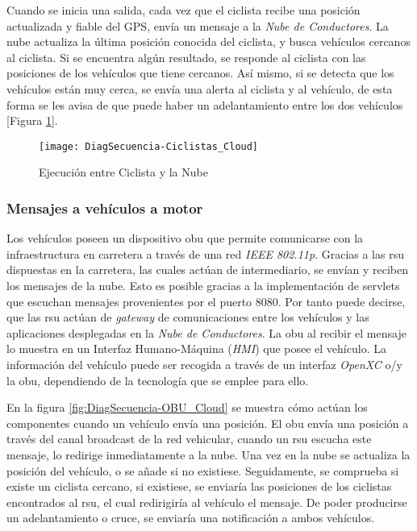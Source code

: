 Cuando se inicia una salida, cada vez que el ciclista recibe una posición actualizada
y fiable del GPS, envía un mensaje a la \emph{Nube de Conductores}. La nube actualiza
la última posición conocida del ciclista, y busca vehículos cercanos al ciclista. Si se
encuentra algún resultado, se responde al ciclista con las posiciones de los vehículos
que tiene cercanos. Así mismo, si se detecta que los vehículos están muy cerca, se
envía una alerta al ciclista y al vehículo, de esta forma se les avisa de que puede haber
un adelantamiento entre los dos vehículos [Figura \ref{fig:DiagSecuencia-Ciclista_Cloud}].
\begin{figure}[H]
	\begin{center}
		\texttt{[image: DiagSecuencia-Ciclistas\_Cloud]}
		\caption{Ejecución entre Ciclista y la Nube}
		\label{fig:DiagSecuencia-Ciclista_Cloud}
	\end{center}
\end{figure}

\subsubsection{Mensajes a vehículos a motor}\label{sssection:mensajesvehiculomotor}
Los vehículos poseen un dispositivo \gls{obu} que permite comunicarse con la infraestructura
en carretera a través de una red \emph{IEEE 802.11p}. Gracias a las \gls{rsu} dispuestas
en la carretera, las cuales actúan de intermediario, se envían y reciben los mensajes
de la nube. Esto es posible gracias a la implementación de servlets que escuchan mensajes
provenientes por el puerto 8080. Por tanto puede decirse, que las \gls{rsu} actúan de
\emph{gateway} de comunicaciones entre los vehículos y las aplicaciones desplegadas
en la \emph{Nube de Conductores}. La \gls{obu} al recibir el mensaje lo muestra en
un Interfaz Humano-Máquina (\emph{HMI}) que posee el vehículo. La información del vehículo
puede ser recogida a través de un interfaz \emph{OpenXC} o/y la \gls{obu}, dependiendo
de la tecnología que se emplee para ello.

En la figura \ref{fig:DiagSecuencia-OBU_Cloud} se muestra cómo actúan los componentes
cuando un vehículo envía una posición. El \gls{obu} envía una posición a través del canal
broadcast de la red vehicular, cuando un \gls{rsu} escucha este mensaje, lo redirige inmediatamente
a la nube. Una vez en la nube se actualiza la posición del vehículo, o se añade si no existiese.
Seguidamente, se comprueba si existe un ciclista cercano, si existiese, se enviaría las posiciones
de los ciclistas encontrados al \gls{rsu}, el cual redirigiría al vehículo el mensaje. De poder producirse
un adelantamiento o cruce, se enviaría una notificación a ambos vehículos.


